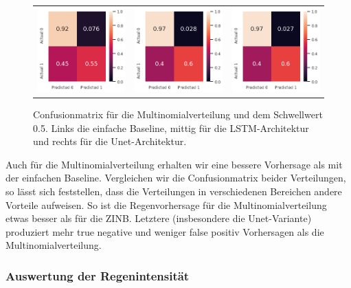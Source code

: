 \begin{figure}[h]
\begin{tabular}{ccc}
\includegraphics[width=45mm]{abb/simpleBaseLine.png}&
\includegraphics[width=45mm]{abb/categoricalConfusion_LSTM.png}&
\includegraphics[width=45mm]{abb/categoricalConfusion_UNET.png}
\end{tabular}
\caption{Confusionmatrix für die Multinomialverteilung und dem Schwellwert 0.5. Links die einfache Baseline, mittig für die LSTM-Architektur und rechts für die Unet-Architektur. \label{fig:confusionmatrix_cat}}
\end{figure}

\noindent Auch für die Multinomialverteilung erhalten wir eine bessere Vorhersage als mit der einfachen Baseline.
Vergleichen wir die Confusionmatrix beider Verteilungen, so lässt sich feststellen, dass die Verteilungen in verschiedenen Bereichen andere Vorteile aufweisen.
So ist die Regenvorhersage für die Multinomialverteilung etwas besser als für die ZINB. Letztere (insbesondere die Unet-Variante) produziert mehr true negative und weniger false positiv Vorhersagen als die Multinomialverteilung.

\subsubsection{Auswertung der Regenintensität}

